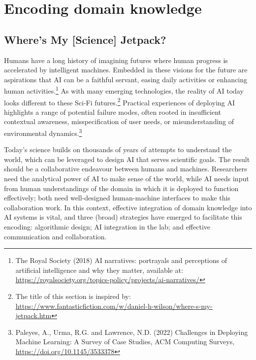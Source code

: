 \hypertarget{encoding-domain-knowledge}{%
\section{Encoding domain knowledge}\label{encoding-domain-knowledge}}

\hypertarget{wheres-my-science-jetpack}{%
\subsection{\texorpdfstring{Where's My {[}Science{]} Jetpack?
}{Where's My {[}Science{]} Jetpack? }}\label{wheres-my-science-jetpack}}

Humans have a long history of imagining futures where human progress is
accelerated by intelligent machines. Embedded in these visions for the
future are aspirations that AI can be a faithful servant, easing daily
activities or enhancing human activities.\footnote{The Royal Society
  (2018) AI narratives: portrayals and perceptions of artificial
  intelligence and why they matter, available at:
  \href{https://royalsociety.org/topics-policy/projects/ai-narratives/}{\uline{https://royalsociety.org/topics-policy/projects/ai-narratives/}}}
As with many emerging technologies, the reality of AI today looks
different to these Sci-Fi futures.\footnote{The title of this section is
  inspired by:
  \href{https://www.fantasticfiction.com/w/daniel-h-wilson/where-s-my-jetpack.htm}{\uline{https://www.fantasticfiction.com/w/daniel-h-wilson/where-s-my-jetpack.htm}}}
Practical experiences of deploying AI highlights a range of potential
failure modes, often rooted in insufficient contextual awareness,
misspecification of user needs, or misunderstanding of environmental
dynamics.\footnote{Paleyes, A., Urma, R.G. and Lawrence, N.D. (2022)
  Challenges in Deploying Machine Learning: A Survey of Case Studies,
  ACM Computing Surveys,
  \href{https://doi.org/10.1145/3533378}{\uline{https://doi.org/10.1145/3533378}}}

Today's science builds on thousands of years of attempts to understand
the world, which can be leveraged to design AI that serves scientific
goals. The result should be a collaborative endeavour between humans and
machines. Researchers need the analytical power of AI to make sense of
the world, while AI needs input from human understandings of the domain
in which it is deployed to function effectively; both need well-designed
human-machine interfaces to make this collaboration work. In this
context, effective integration of domain knowledge into AI systems is
vital, and three (broad) strategies have emerged to facilitate this
encoding: algorithmic design; AI integration in the lab; and effective
communication and collaboration.


